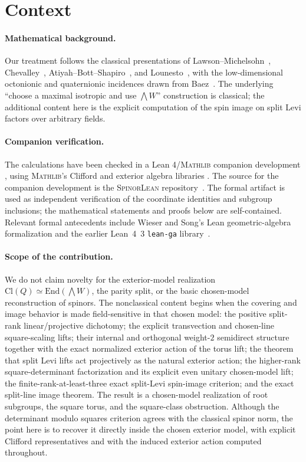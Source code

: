 \documentclass{birkjour}
\theoremstyle{plain}
\theoremstyle{definition}
\theoremstyle{remark}
\numberwithin{equation}{section}
\newcommand{\Cl}{\mathrm{Cl}}
\newcommand{\End}{\mathrm{End}}
\newcommand{\SpinorLean}{\textsc{SpinorLean}\xspace}
\newcommand{\Lean}{Lean~4\xspace}
\newcommand{\Mathlib}{\textsc{Mathlib}\xspace}
\begin{document}
\section{Context}
\label{sec:related}

\paragraph{Mathematical background.} Our treatment follows the classical
presentations of Lawson--Michelsohn~\cite{LawsonMichelsohn1989},
Chevalley~\cite{Chevalley1997}, Atiyah--Bott--Shapiro~\cite{AtiyahBottShapiro1964},
and Lounesto~\cite{Lounesto2001}, with the low-dimensional octonionic and
quaternionic incidences drawn from Baez~\cite{Baez2002}. The underlying
``choose a maximal isotropic and use $\bigwedge W$'' construction is classical;
the additional content here is the explicit computation of the spin image on
split Levi factors over arbitrary fields.

\paragraph{Companion verification.}
The calculations have been checked in a Lean 4/\Mathlib companion development
\cite{deMouraUllrich2021}, using \Mathlib's Clifford and exterior algebra libraries
\cite{Mathlib,MathlibCommunity2020}. The source for the companion development is
the \SpinorLean repository~\cite{SpinorLeanRepo}. The formal artifact is used as
independent verification of the coordinate identities and subgroup inclusions;
the mathematical statements and proofs below are self-contained. Relevant formal
antecedents include Wieser and Song's Lean geometric-algebra formalization
\cite{Wieser2022Clifford} and the earlier \Lean~3 \texttt{lean-ga}
library~\cite{LeanGA}.

\paragraph{Scope of the contribution.} We do not claim novelty for the exterior-model
realization $\Cl(Q)\simeq\End(\bigwedge W)$, the parity split, or the basic
chosen-model reconstruction of spinors. The nonclassical content begins when the
covering and image behavior is made field-sensitive in that chosen model: the
positive split-rank linear/projective dichotomy; the explicit transvection and
chosen-line square-scaling lifts; their internal and orthogonal weight-$2$
semidirect structure together with the exact normalized exterior action of the
torus lift; the theorem that split Levi lifts act projectively as the natural
exterior action; the higher-rank square-determinant factorization and its
explicit even unitary chosen-model lift; the finite-rank-at-least-three exact
split-Levi spin-image criterion; and the exact split-line image theorem. The
result is a chosen-model realization of root subgroups, the square torus, and
the square-class
obstruction. Although the determinant modulo squares criterion agrees with the
classical spinor norm, the point here is to recover it directly inside the
chosen exterior model, with explicit Clifford representatives and with the
induced exterior action computed throughout.
\end{document}
